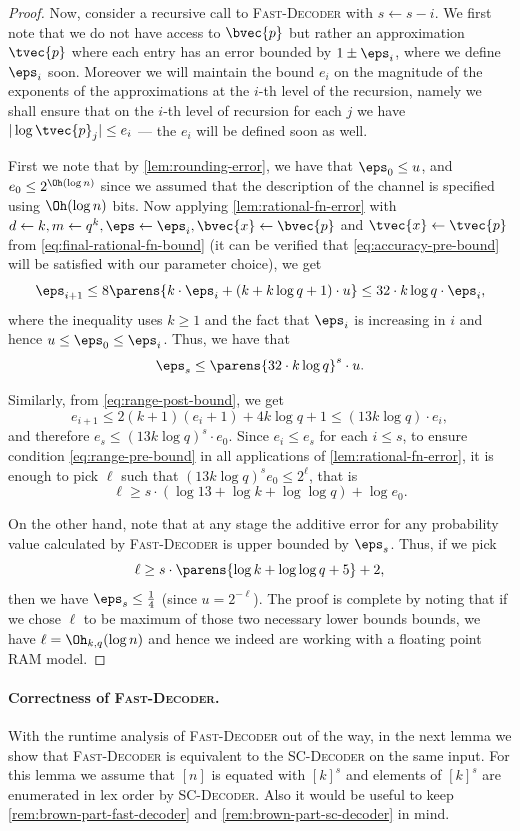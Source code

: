 \documentclass[11pt]{article}
\begin{document}
\begin{proof}
		Now, consider a recursive call to \textsc{Fast-Decoder} with $s\gets s-i$. We first note that we do not have access to $\bvec{p}$ but rather an approximation $\tvec{p}$ where each entry has an error bounded by $1\pm \eps_i$, where we define $\eps_i$ soon. Moreover we will maintain the bound $e_i$ on the magnitude of the exponents of the approximations at the $i$-th level of the recursion, namely we shall ensure that on the $i$-th level of recursion for each $j$ we have $|\log \tvec{p}_j| \leq e_i$ --- the $e_i$ will be defined soon as well.
		
		First we note that by \cref{lem:rounding-error}, we have that $\eps_0 \le u$, and $e_0 \leq 2^{\Oh(\log n)}$ since we assumed that the description of the channel is specified using $\Oh(\log n)$ bits.
		Now applying \cref{lem:rational-fn-error} with $d\gets k, m\gets q^k, \eps\gets \eps_i, \bvec{x}\gets \bvec{p}$ and $\tvec{x}\gets \tvec{p}$ from \cref{eq:final-rational-fn-bound} (it can be verified that \cref{eq:accuracy-pre-bound} will be satisfied with our parameter choice), we get
		\[\eps_{i+1}\le 8\parens{k\cdot \eps_i + (k+k\log{q}+1)\cdot u}\le 32\cdot k\log{q} \cdot \eps_i,\]
		where the inequality uses $k\ge 1$ and  the fact that $\eps_i$ is increasing in $i$ and hence $u\le \eps_0\le \eps_i$.
		Thus, we have that
		\[\eps_s \le \parens{32\cdot k\log{q}}^s\cdot u.\]
		
		Similarly, from \cref{eq:range-post-bound}, we get
		\[
		e_{i+1} \leq 2(k+1)(e_i + 1) + 4 k \log q + 1 \leq (13 k \log q) \cdot e_i,
		\]
		and therefore $e_s \leq (13 k \log q)^s \cdot e_0$. Since $e_i \leq e_s$ for each $i \leq s$, to ensure condition \cref{eq:range-pre-bound} in all applications of \cref{lem:rational-fn-error}, it is enough to pick $\ell$ such that $(13 k \log q)^s e_0 \leq 2^{\ell}$, that is 
		\[\ell \geq s \cdot (\log 13 + \log k + \log \log q) + \log e_0.\]
		
		On the other hand, note that at any stage the additive error for any probability value calculated by \textsc{Fast-Decoder} is upper bounded by $\eps_s$. Thus, if we pick
		\[\ell \geq s\cdot \parens{\log{k}+\log\log{q}+5}+2,\]
		then we have $\eps_s\le \frac 14$ (since $u=2^{-\ell}$). The proof is complete by noting that if we chose $\ell$ to be maximum of those two necessary lower bounds bounds, we have $\ell=\Oh_{k,q}(\log{n})$ and hence we indeed are working with a floating point RAM model.
	\end{proof}



\paragraph{Correctness of \textsc{Fast-Decoder}.} With the runtime analysis of \textsc{Fast-Decoder} out of the way, in the next lemma we show that \textsc{Fast-Decoder} is equivalent to the
\textsc{SC-Decoder} on the same input. For this lemma we assume that $[n]$ is equated with $[k]^s$ and elements of $[k]^s$ are enumerated in lex order by \textsc{SC-Decoder}. Also it would be useful to keep \cref{rem:brown-part-fast-decoder} and \cref{rem:brown-part-sc-decoder} in mind.
\end{document}
